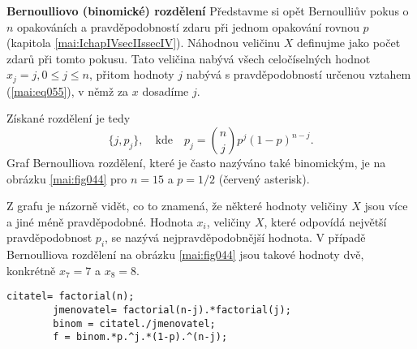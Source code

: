 \begin{mdframed}[style=mdexam]
  \begin{example}\label{mai:exam065}
    \textbf{Bernoulliovo (binomické) rozdělení}\newline
    Představme si opět Bernoulliův pokus o \(n\) opakováních a pravděpodobností zdaru při jednom
    opakování rovnou \(p\) (kapitola \ref{mai:IchapIVsecIIssecIV}). Náhodnou veličinu \(X\)
    definujme jako počet zdarů při tomto pokusu. Tato veličina nabývá všech celočíselných hodnot
    \(x_j = j, 0 \leq j \leq n\), přitom hodnoty \(j\) nabývá s pravděpodobností určenou vztahem
    (\ref{mai:eq055}), v němž za \(x\) dosadíme \(j\). 
    
    {\centering
      \captionsetup{type=figure}
    \par}
    
    Získané rozdělení je tedy
    \begin{equation*}
      \lbrace j,p_j\rbrace, \quad\text{kde}\quad p_j = \binom{n}{j}p^j(1 - p)^{n-j}.
    \end{equation*}
    Graf Bernoulliova rozdělení, které je často nazýváno také binomickým, je na obrázku 
    \ref{mai:fig044} pro \(n = 15\) a \(p = 1/2\) (červený asterisk).
    
    Z grafu je názorně vidět, co to znamená, že některé hodnoty veličiny \(X\) jsou více a jiné méně 
    pravděpodobné. Hodnota \(x_i\), veličiny \(X\), které odpovídá největší pravděpodobnost \(p_i\), 
    se nazývá nejpravděpodobnější hodnota. V případě Bernoulliova rozdělení na obrázku 
    \ref{mai:fig044} jsou takové hodnoty dvě, konkrétně \(x_7 = 7\) a \(x_8 = 8\).
    
      \begin{lstlisting}[style=luaCPPStyle, caption={PPST001.m}]
        citatel= factorial(n);
        jmenovatel= factorial(n-j).*factorial(j);
        binom = citatel./jmenovatel;
        f = binom.*p.^j.*(1-p).^(n-j);
      \end{lstlisting}
  \end{example}
\end{mdframed}
